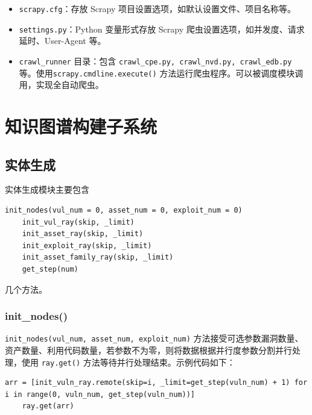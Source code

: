 \documentclass[a4paper,AutoFakeBold,oneside,12pt]{book}
\begin{document}
\begin{itemize}
	\item \lstinline|scrapy.cfg|：存放 Scrapy 项目设置选项，如默认设置文件、项目名称等。
	\item \lstinline|settings.py|：Python 变量形式存放 Scrapy 爬虫设置选项，如并发度、请求延时、User-Agent 等。
	\item \lstinline|crawl_runner| 目录：包含 \lstinline|crawl_cpe.py, crawl_nvd.py, crawl_edb.py| 等。使用\linebreak \lstinline|scrapy.cmdline.execute()| 方法运行爬虫程序。可以被调度模块调用，实现全自动爬虫。
\end{itemize}

\section{知识图谱构建子系统}

\subsection{实体生成}

实体生成模块主要包含
\begin{lstlisting}[style = python]
	init_nodes(vul_num = 0, asset_num = 0, exploit_num = 0)
	init_vul_ray(skip, _limit)
	init_asset_ray(skip, _limit)
	init_exploit_ray(skip, _limit)
	init_asset_family_ray(skip, _limit)
	get_step(num)
\end{lstlisting}
几个方法。

\subsubsection{init{\_}nodes()}

\lstinline|init_nodes(vul_num, asset_num, exploit_num)| 方法接受可选参数漏洞数量、资产数量、利用代码数量，若参数不为零，则将数据根据并行度参数分割并行处理，使用 \lstinline|ray.get()| 方法等待并行处理结束。示例代码如下：
\begin{lstlisting}[style = python]
	arr = [init_vuln_ray.remote(skip=i, _limit=get_step(vuln_num) + 1) for i in range(0, vuln_num, get_step(vuln_num))]
	ray.get(arr)
\end{lstlisting}
\end{document}
